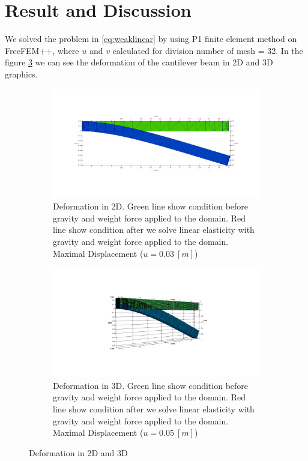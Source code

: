 \documentclass[a4paper,11pt]{article}
\begin{document}
\section{Result and Discussion}
We solved the problem in \eqref{eq:weaklinear} by using P1 finite element method on FreeFEM++, where $u$ and $v$ calculated for division number of mesh = 32. In the figure \ref{fig:displacementresult} we can see the deformation of the cantilever beam in 2D and 3D graphics.
\begin{figure}[h!]
	\begin{subfigure}[b]{0.5\linewidth}
		\centering
		\includegraphics[width=\linewidth]{picture/conference/2d1}
		\caption{Deformation in 2D. Green line show condition before gravity and weight force applied to the domain. Red line show condition after we solve linear elasticity with gravity and weight force applied to the domain. Maximal Displacement ($u = 0.03\ [m]$)}
		\label{fig:2dresult}
	\end{subfigure}
\quad
	\begin{subfigure}[b]{0.5\linewidth}
		\centering
		\includegraphics[width=\linewidth]{picture/conference/3d1}
		\caption{Deformation in 3D. Green line show condition before gravity and weight force applied to the domain. Red line show condition after we solve linear elasticity with gravity and weight force applied to the domain. Maximal Displacement ($u = 0.05\ [m]$)}
		\label{fig:3dresult}
	\end{subfigure}
\caption{Deformation in 2D and 3D}
\label{fig:displacementresult}
\end{figure}
\end{document}
